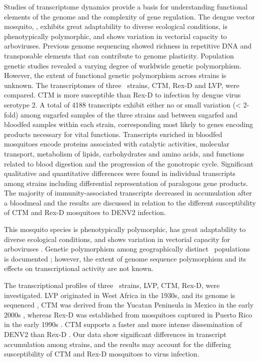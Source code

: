 
Studies of transcriptome dynamics provide a basis for understanding functional elements of the genome and the complexity of gene regulation.
The dengue vector mosquito, \Aea, exhibits great adaptability to diverse ecological conditions, is phenotypically polymorphic, and shows variation in vectorial capacity to arboviruses.
Previous genome sequencing showed richness in repetitive DNA and transposable elements that can contribute to genome plasticity.
Population genetic studies revealed a varying degree of worldwide genetic polymorphism.
However, the extent of functional genetic polymorphism across strains is unknown.
The transcriptomes of three \Aa\ strains, \gls{CTM}, \gls{Rex-D} and \gls{LVP}, were compared.
CTM is more susceptible than \gls{Rex-D} to infection by dengue virus serotype 2.
A total of 4188 transcripts exhibit either no or small variation (< 2-fold) among sugarfed samples of the three strains and between sugarfed and bloodfed samples within each strain, corresponding most likely to genes encoding products necessary for vital functions.
Transcripts enriched in bloodfed mosquitoes encode proteins associated with catalytic activities, molecular transport, metabolism of lipids, carbohydrates and amino acids, and functions related to blood digestion and the progression of the gonotropic cycle.
Significant qualitative and quantitative differences were found in individual transcripts among strains including differential representation of paralogous gene products.
The majority of immunity-associated transcripts decreased in accumulation after a bloodmeal and the results are discussed in relation to the different susceptibility of \gls{CTM} and \gls{Rex-D} mosquitoes to \gls{DENV2} infection.

This mosquito species is phenotypically polymorphic, has great adaptability to diverse ecological conditions, and shows variation in vectorial capacity for arboviruses \cite{Bennett2002,Black2002,Kuno2010}.
Genetic polymorphism among geographically distinct \Aa\ populations is documented \cite{Urdaneta-Marquez2011}; however, the extent of genome sequence polymorphism and its effects on transcriptional activity are not known.

The transcriptional profiles of three \Aa\ strains, \gls{LVP}, \gls{CTM}, \gls{Rex-D}, were investigated.
\gls{LVP} originated in West Africa in the 1930s, and its genome is sequenced \cite{Nene2007}, \gls{CTM} was derived from the Yucatan Peninsula in Mexico in the early 2000s \cite{Bennett2002,Gubler1985,Richardson2006a}, whereas \gls{Rex-D} was established from mosquitoes captured in Puerto Rico in the early 1990s \cite{Miller1991}.
\gls{CTM} supports a faster and more intense dissemination of \gls{DENV2} than \gls{Rex-D} \cite{Bennett2002,Salazar2007}.
Our data show significant differences in transcript accumulation among strains, and the results may account for the differing susceptibility of \gls{CTM} and \gls{Rex-D} mosquitoes to virus infection.


